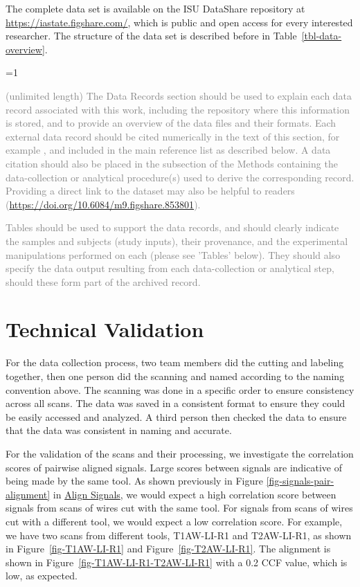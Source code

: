 \documentclass[fleqn,10pt]{wlscirep}
\newcommand{\ifinstruction}{0} %
\begin{document}
The complete data set is available on the ISU DataShare repository at
\href{https://iastate.figshare.com/}{https://iastate.figshare.com/},
which is public and open access for every interested researcher. The
structure of the data set is described before in
Table~\ref{tbl-data-overview}.

\ifnum \ifinstruction=1

\textcolor{gray}{(unlimited length) The Data Records section should be used to explain each data record associated with this work, including the repository where this information is stored, and to provide an overview of the data files and their formats. Each external data record should be cited numerically in the text of this section, for example \cite{Hao:gidmaps:2014}, and included in the main reference list as described below. A data citation should also be placed in the subsection of the Methods containing the data-collection or analytical procedure(s) used to derive the corresponding record. Providing a direct link to the dataset may also be helpful to readers (\hyperlink{https://doi.org/10.6084/m9.figshare.853801}{https://doi.org/10.6084/m9.figshare.853801}).}

\textcolor{gray}{Tables should be used to support the data records, and should clearly indicate the samples and subjects (study inputs), their provenance, and the experimental manipulations performed on each (please see 'Tables' below). They should also specify the data output resulting from each data-collection or analytical step, should these form part of the archived record.}
\fi

\section*{Technical Validation}\label{sec-technical-validation}

For the data collection process, two team members did the cutting and
labeling together, then one person did the scanning and named according
to the naming convention above. The scanning was done in a specific
order to ensure consistency across all scans. The data was saved in a
consistent format to ensure they could be easily accessed and analyzed.
A third person then checked the data to ensure that the data was
consistent in naming and accurate.

For the validation of the scans and their processing, we investigate the
correlation scores of pairwise aligned signals. Large scores between
signals are indicative of being made by the same tool. As shown
previously in Figure \ref{fig-signals-pair-alignment} in
\hyperref[sec-align-signals]{Align Signals}, we would expect a high
correlation score between signals from scans of wires cut with the same
tool. For signals from scans of wires cut with a different tool, we
would expect a low correlation score. For example, we have two scans
from different tools, T1AW-LI-R1 and T2AW-LI-R1, as shown in
Figure~\ref{fig-T1AW-LI-R1} and Figure~\ref{fig-T2AW-LI-R1}. The
alignment is shown in Figure~\ref{fig-T1AW-LI-R1-T2AW-LI-R1} with a 0.2
CCF value, which is low, as expected.
\end{document}
